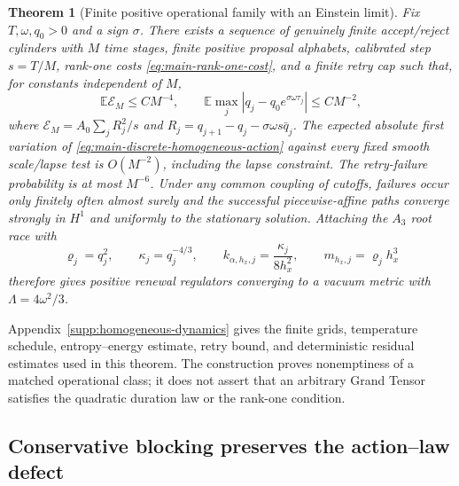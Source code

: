 \documentclass[11pt]{article}
\newtheorem{theorem}{Theorem}[section]
\theoremstyle{definition}
\theoremstyle{remark}
\begin{document}
\begin{theorem}[Finite positive operational family with an Einstein limit]
\label{thm:main-explicit-operational-family}
Fix $T,\omega,q_0>0$ and a sign $\sigma$.  There exists a sequence of genuinely
finite accept/reject cylinders with $M$ time stages, finite positive proposal
alphabets, calibrated step $s=T/M$, rank-one costs
\eqref{eq:main-rank-one-cost}, and a finite retry cap such that, for constants
independent of $M$,
\begin{equation}
 \mathbb E\mathcal E_M\le CM^{-4},\qquad
 \mathbb E\max_j|q_j-q_0e^{\sigma\omega\tau_j}|\le CM^{-2},
 \label{eq:main-stochastic-profile}
\end{equation}
where
$\mathcal E_M=A_0\sum_jR_j^2/s$ and
$R_j=q_{j+1}-q_j-\sigma\omega s\bar q_j$.  The expected absolute first
variation of \eqref{eq:main-discrete-homogeneous-action} against every fixed
smooth scale/lapse test is $O(M^{-2})$, including the lapse constraint.  The
retry-failure probability is at most $M^{-6}$.  Under any common coupling of
cutoffs, failures occur only finitely often almost surely and the successful
piecewise-affine paths converge strongly in $H^1$ and uniformly to the
stationary solution.  Attaching the $A_3$ root race with
\begin{equation}
 \varrho_j=q_j^2,\qquad \kappa_j=q_j^{-4/3},\qquad
 k_{\alpha,h_x,j}=\frac{\kappa_j}{8h_x^2},\qquad
 m_{h_x,j}=\varrho_jh_x^3
 \label{eq:main-stochastic-root-rates}
\end{equation}
therefore gives positive renewal regulators converging to a vacuum metric with
$\Lambda=4\omega^2/3$.
\end{theorem}

Appendix~\ref{supp:homogeneous-dynamics} gives the finite grids, temperature
schedule, entropy--energy estimate, retry bound, and deterministic residual
estimates used in this theorem.  The construction proves nonemptiness of a
matched operational class; it does not assert that an arbitrary Grand Tensor
satisfies the quadratic duration law or the rank-one condition.

\subsection{Conservative blocking preserves the action--law defect}
\label{subsec:homogeneous-blocking-main}
\end{document}
